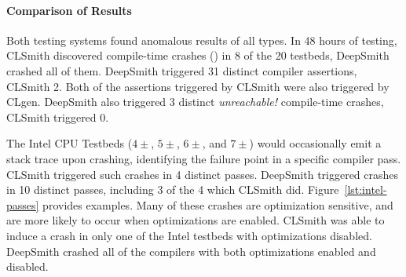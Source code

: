 



\paragraph{Comparison of Results} %
Both testing systems found anomalous results of all types.
%
In 48 hours of testing, CLSmith discovered compile-time crashes (\bc) in 8 of the 20 testbeds, DeepSmith crashed all of them. DeepSmith triggered 31 distinct compiler assertions, CLSmith 2. Both of the assertions triggered by CLSmith were also triggered by CLgen. DeepSmith also triggered 3 distinct \emph{unreachable!} compile-time crashes, CLSmith triggered 0.

The Intel CPU Testbeds ($4\pm$, $5\pm$, $6\pm$, and $7\pm$) would occasionally emit a stack trace upon crashing, identifying the failure point in a specific compiler pass. CLSmith triggered such crashes in 4 distinct passes. DeepSmith triggered crashes in 10 distinct passes, including 3 of the 4 which CLSmith did. Figure~\ref{lst:intel-passes} provides examples. Many of these crashes are optimization sensitive, and are more likely to occur when optimizations are enabled. CLSmith was able to induce a crash in only one of the Intel testbeds with optimizations disabled. DeepSmith crashed all of the compilers with both optimizations enabled and disabled.


%

